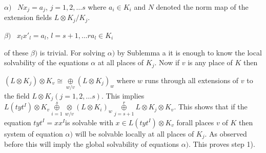 \noindent 
$\alpha)$~  $Nx_j=a_j$, $j=1,2, \ldots s$ where $a_i \in K_i$ and $N$
denoted the norm map of the extension fields $L \otimes K_j/K_j$. 

\noindent
$\beta)$~ $x_l x'_l=a_l$, $l=s+1, \ldots r a_l \in K_i$  

\noindent
of these $\beta)$ is trivial. For solving $\alpha)$ by Sublemma a it
is enough to know the local solvability of the equations $\alpha$ at
all places of $K_j$. Now if $v$ is any place of $K$ then 

\noindent
$(L \otimes K_j)\otimes K_v \cong \underset {w/v}\oplus (L \otimes 
K_j)_w$ where $w$ runs through all extensions of $v$ to the field $L
\otimes K_j (j=1,2,\ldots s)$. This implies $L(tyt^I)\otimes K_v
\overset{s} {\underset{i=1}\oplus} \underset {w/v} \otimes (L \otimes
K_i)_w \overset{r}{\underset{j=s+1}\oplus} L \otimes K_j \otimes
K_v$. This shows that if the equation $tyt^I=xx^I$is solvable with $x
\in L(tyt^I) \otimes K_v$  for\pageoriginale all places $v$ of $K$
then system of equation $\alpha)$ will be solvable locally at all
places of $K_j$. As observed before this will imply the global
solvability of equations $\alpha)$. This proves step 1).  

